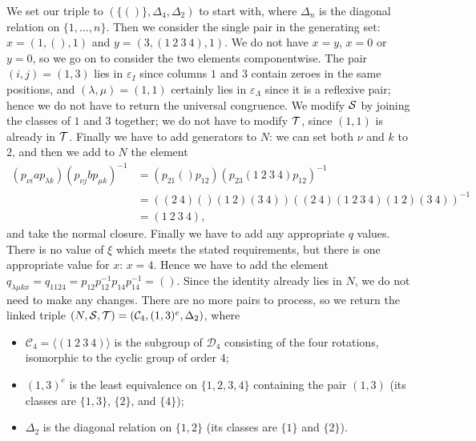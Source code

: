 \begin{example}
  We set our triple to $(\{()\}, \Delta_4, \Delta_2)$ to start with, where
  $\Delta_n$ is the diagonal relation on $\{1, \ldots, n\}$.  Then we consider
  the single pair in the generating set: $x = \left(1, (), 1\right)$ and
  $y = \left(3, (1~2~3~4), 1\right)$.  We do not have $x=y$, $x=0$ or $y=0$, so
  we go on to consider the two elements componentwise.  The pair $(i,j) = (1,3)$
  lies in $\varepsilon_I$ since columns $1$ and $3$ contain zeroes in the same
  positions, and $(\lambda,\mu) = (1,1)$ certainly lies in $\varepsilon_\Lambda$
  since it is a reflexive pair; hence we do not have to return the universal
  congruence.  We modify $\mathcal{S}$ by joining the classes of $1$ and $3$ together;
  we do not have to modify $\mathcal{T}$, since $(1,1)$ is already in $\mathcal{T}$.  Finally we
  have to add generators to $N$: we can set both $\nu$ and $k$ to $2$, and then
  we add to $N$ the element
  \begin{align*}
    (p_{\nu i}ap_{\lambda k})(p_{\nu j}bp_{\mu k})^{-1}
    &= \left(p_{2 1}()p_{1 2}\right)\left(p_{2 3}(1~2~3~4)p_{1 2}\right)^{-1} \\
    &= \left((2~4)()(1~2)(3~4)\right)\left((2~4)(1~2~3~4)(1~2)(3~4)\right)^{-1}\\
    &= (1~2~3~4),
  \end{align*}
  and take the normal closure.  Finally we have to add any appropriate $q$
  values.  There is no value of $\xi$ which meets the stated requirements, but
  there is one appropriate value for $x$: $x = 4$.  Hence we have to add the
  element
  $q_{\lambda \mu k x}
  = q_{1 1 2 4}
  = p_{1 2} p_{1 2}^{-1} p_{1 4} p_{1 4}^{-1}
  = ()$.
  Since the identity already lies in $N$, we do not need to make any changes.
  There are no more pairs to process, so we return the linked triple
  $(N,\mathcal{S},\mathcal{T}) = (\mathcal{C}_4, (1,3)^e, \Delta_2)$, where
  \begin{itemize}
  \item $\mathcal{C}_4 = \langle (1~2~3~4) \rangle$ is the subgroup of
    $\mathcal{D}_4$ consisting of the four rotations, isomorphic to the cyclic
    group of order $4$;
  \item $(1,3)^e$ is the least equivalence on $\{1,2,3,4\}$ containing the pair
    $(1,3)$ (its classes are $\{1,3\}$, $\{2\}$, and $\{4\}$);
  \item $\Delta_2$ is the diagonal relation on $\{1,2\}$ (its classes are
    $\{1\}$ and $\{2\}$).
  \end{itemize}
\end{example}

